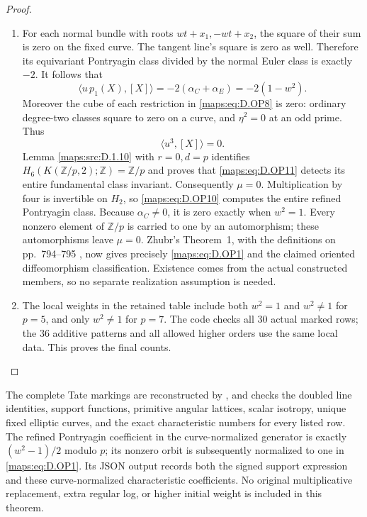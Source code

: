 \begin{proof}
\begin{enumerate}[label=\arabic*.,leftmargin=*]
\item For each normal bundle with roots $wt+x_1,-wt+x_2$,
the square of their sum is zero on the fixed curve.
The tangent line's square is zero as well. Therefore its
equivariant Pontryagin class divided by the normal Euler
class is exactly $-2$. It follows that
\[
 \langle u\,p_1(X),[X]\rangle
   =-2(\alpha_C+\alpha_E)
   =-2(1-w^2).
 \tag{D.OP10}\label{maps:eq:D.OP10}
\]
Moreover the cube of each restriction in \eqref{maps:eq:D.OP8} is zero:
ordinary degree-two classes square to zero on a curve,
and $\eta^2=0$ at an odd prime. Thus
\[
                        \langle u^3,[X]\rangle=0.
 \tag{D.OP11}\label{maps:eq:D.OP11}
\]
Lemma \ref{maps:src:D.1.10} with $r=0,d=p$ identifies
$H_6(K(\mathbb Z/p,2);\mathbb Z)=\mathbb Z/p$
and proves that \eqref{maps:eq:D.OP11} detects its entire fundamental
class invariant. Consequently $\mu=0$.
Multiplication by four is invertible on $H_2$, so
\eqref{maps:eq:D.OP10} computes the entire refined Pontryagin class.
Because $\alpha_C\ne0$, it is zero exactly when $w^2=1$.
Every nonzero element of $\mathbb Z/p$ is carried to one
by an automorphism; these automorphisms leave $\mu=0$.
Zhubr's Theorem~1, with the definitions on pp.~794--795
\cite{manZhubr75}, now gives precisely \eqref{maps:eq:D.OP1} and the
claimed oriented diffeomorphism classification. Existence
comes from the actual constructed members, so no separate
realization assumption is needed.

\item The local weights in the retained table include both
$w^2=1$ and $w^2\ne1$ for $p=5$, and only $w^2\ne1$
for $p=7$. The code checks all $30$ actual marked rows;
the $36$ additive patterns and all allowed higher orders
use the same local data. This proves the final counts.
\end{enumerate}
\end{proof}

The complete Tate markings are reconstructed by
, and
 checks the doubled
line identities, support functions, primitive angular
lattices, scalar isotropy, unique fixed elliptic curves,
and the exact characteristic numbers for every listed row.
The refined Pontryagin coefficient in the curve-normalized
generator is exactly $(w^2-1)/2$ modulo $p$; its nonzero
orbit is subsequently normalized to one in \eqref{maps:eq:D.OP1}.
Its JSON output records both the signed support expression
and these curve-normalized characteristic coefficients.
No original
multiplicative replacement, extra regular log, or
higher initial weight is included in this theorem.


